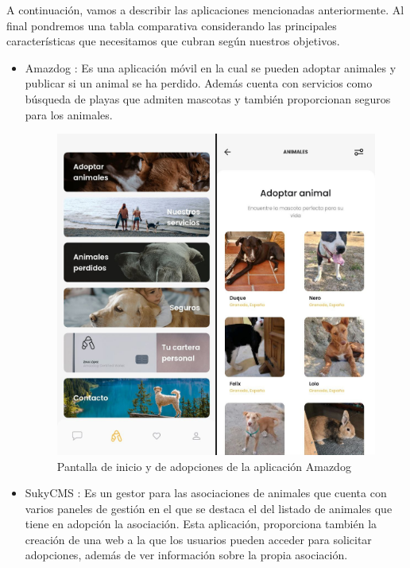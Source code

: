 A continuación, vamos a describir las aplicaciones mencionadas anteriormente. Al final pondremos una tabla comparativa considerando las principales características que necesitamos que cubran según nuestros objetivos.

\begin{itemize}
	\item Amazdog \cite{amazdog}: Es una aplicación móvil en la cual se pueden adoptar animales y publicar si un animal se ha perdido. Además cuenta con servicios como búsqueda de playas que admiten mascotas y también proporcionan seguros para los animales.
	
\begin{figure}[H]
	\centering
	\includegraphics[width=0.7\linewidth]{"Sprint 0/amazdog"}
	\caption{Pantalla de inicio y de adopciones de la aplicación Amazdog}
	\label{fig:amazdog}
\end{figure}
	
	\item SukyCMS \cite{sukycms}: Es un gestor para las asociaciones de animales que cuenta con varios paneles de gestión en el que se destaca el del listado de animales que tiene en adopción la asociación. Esta aplicación, proporciona también la creación de una web a la que los usuarios pueden acceder para solicitar adopciones, además de ver información sobre la propia asociación.
	

\end{itemize}
